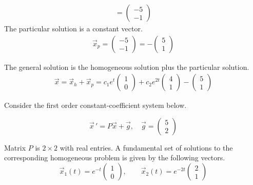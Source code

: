 {\begin{align}
    = \begin{pmatrix} -5 \\ -1 \end{pmatrix}
\end{align}
The particular solution is a constant vector. 
\begin{align}
    \vec x_p =  \begin{pmatrix} -5 \\ -1 \end{pmatrix} = - \begin{pmatrix} 5 \\ 1 \end{pmatrix}
\end{align}

The general solution is the homogeneous solution plus the particular solution. 
\begin{align}
    \vec x = \vec x_h + \vec x_p = c_1e^{t}\begin{pmatrix}1\\0\end{pmatrix} + c_2e^{2t}\begin{pmatrix}4\\1\end{pmatrix} - \begin{pmatrix} 5\\1\end{pmatrix}
\end{align}

    } 
   \else
   \fi

\fi 





\ifnum {}
\ifnum {} \newpage \fi
\question[5] Consider the first order constant-coefficient system below. 
    
\[\vec{x}\, ' = P\vec {x} + \vec g, \quad \vec g = \begin{pmatrix} 5\\2\end{pmatrix}\] 

Matrix $P$ is $2\times2$ with real entries. A fundamental set of solutions to the corresponding homogeneous problem is given by the following vectors.   
\[\vec{x}_{1}(t)=e^{-t}\begin{pmatrix}1\\0\end{pmatrix},\qquad \vec{x}_{2}(t)=e^{-2t}\begin{pmatrix}2\\1\end{pmatrix}\]  

